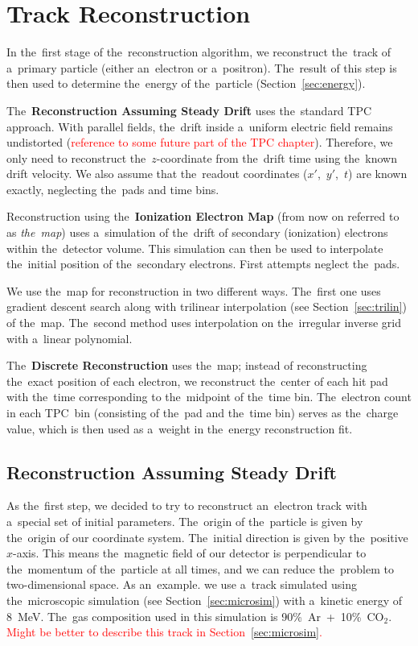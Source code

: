 \chapter{Track Reconstruction}
\label{sec:track}
	In the~first stage of the~reconstruction algorithm, we reconstruct the~track of a~primary particle (either an~electron or a~positron). The~result of this step is then used to determine the~energy of the~particle (Section~\ref{sec:energy}).
	
	The~\textbf{Reconstruction Assuming Steady Drift} uses the~standard \ac{TPC} approach. With parallel fields, the~drift inside a~uniform electric field remains undistorted (\textcolor{red}{reference to some future part of the TPC chapter}). Therefore, we only need to reconstruct the~$z$\nobreakdash-coordinate from the~drift time using the~known drift velocity. We also assume that the~readout coordinates ($x'$,~$y'$,~$t$) are known exactly, neglecting the~pads and time bins.
	
	Reconstruction using the~\textbf{Ionization Electron Map} (from now on referred to as \emph{the~map}) uses a~simulation of the~drift of secondary (ionization) electrons within the~detector volume. This simulation can then be used to interpolate the~initial position of the~secondary electrons. First attempts neglect the~pads.
	
	We use the~map for reconstruction in two different ways. The~first one uses gradient descent search along with trilinear interpolation (see Section~\ref{sec:trilin}) of the~map. The~second method uses interpolation on the~irregular inverse grid with a~linear polynomial.
	
	The~\textbf{Discrete Reconstruction} uses the~map; instead of reconstructing the~exact position of each electron, we reconstruct the~center of each hit pad with the~time corresponding to the~midpoint of the~time bin. The~electron count in each \ac{TPC}~bin (consisting of the~pad and the~time bin) serves as the~charge value, which is then used as a~weight in the~energy reconstruction fit.
	
	\section{Reconstruction Assuming Steady Drift}
	\label{sec:trackfirst}
		As the~first step, we decided to try to reconstruct an~electron track with a~special set of initial parameters. The~origin of the~particle is given by the~origin of our coordinate system. The~initial direction is given by the~positive $x$\nobreakdash-axis. This means the~magnetic field of our detector is perpendicular to the~momentum of the~particle at all times, and we can reduce the~problem to two-dimensional space. As an~example. we use a~track simulated using the~microscopic simulation (see Section~\ref{sec:microsim}) with a~kinetic energy of 8~MeV. The~gas composition used in this simulation is 90\%~Ar~+~10\%~CO$_2$. \textcolor{red}{Might be better to describe this track in Section~\ref{sec:microsim}.}
		
